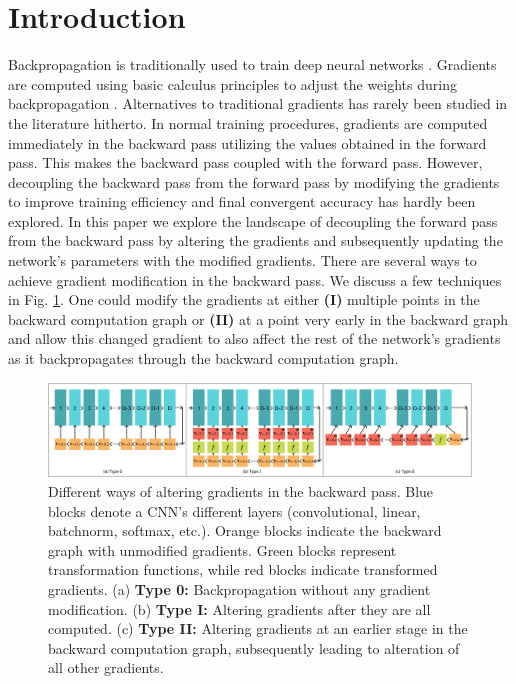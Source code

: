 \documentclass[times,sort&compress]{elsarticle}
\begin{document}
\section{Introduction}
\label{sec:Intr}





Backpropagation is traditionally used to train deep neural networks
\cite{lillicrap2020backpropagation}. Gradients are computed using basic calculus
principles to adjust the weights during backpropagation \cite{lecun1988theoretical}.
Alternatives to traditional gradients has rarely been studied in the literature
hitherto. In normal training procedures, gradients are computed immediately in the
backward pass utilizing the values obtained in the forward pass. This makes the backward
pass coupled with the forward pass. However, decoupling the backward pass from the
forward pass by modifying the gradients to improve training efficiency and final
convergent accuracy has hardly been explored. In this paper we explore the landscape of
decoupling the forward pass from the backward pass by altering the gradients and
subsequently updating the network's parameters with the modified gradients. There are
several ways to achieve gradient modification in the backward pass. We discuss a few
techniques in Fig. \ref{fig:gradient_altering}. One could modify the gradients at either
\textbf{(I)} multiple points in the backward computation graph or \textbf{(II)} at a
point very early in the backward graph and allow this changed gradient to also affect
the rest of the network's gradients as it backpropagates through the backward
computation graph.



\begin{figure}[t]
\centering
\includegraphics[width=1.0\columnwidth]{PGT_Types}
\caption{ Different ways of altering gradients in the backward pass. Blue blocks denote
a CNN's different layers (convolutional, linear, batchnorm, softmax, etc.). Orange
blocks indicate the backward graph with unmodified gradients. Green blocks represent
transformation functions, while red blocks indicate transformed gradients. (a)
\textbf{Type 0:} Backpropagation without any gradient modification. (b) \textbf{Type I:}
Altering gradients after they are all computed. (c) \textbf{Type II:} Altering gradients
at an earlier stage in the backward computation graph, subsequently leading to
alteration of all other gradients. }
\label{fig:gradient_altering}
\end{figure}
\end{document}
